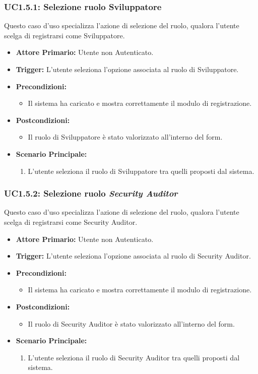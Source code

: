 \documentclass[12pt, a4paper]{article}
\begin{document}
\subsubsection{UC1.5.1: Selezione ruolo Sviluppatore}\label{uc:1.5.1}
Questo caso d'uso specializza l'azione di selezione del ruolo, qualora l'utente scelga di registrarsi come Sviluppatore.
\begin{itemize}
    \item \textbf{Attore Primario:} Utente non Autenticato.
    \item \textbf{Trigger:} L'utente seleziona l'opzione associata al ruolo di Sviluppatore.
    \item \textbf{Precondizioni:}\begin{itemize}\item Il sistema ha caricato e mostra correttamente il modulo di registrazione.\end{itemize}
    \item \textbf{Postcondizioni:}\begin{itemize}\item Il ruolo di Sviluppatore è stato valorizzato all'interno del form.\end{itemize}
    \item \textbf{Scenario Principale:}
    \begin{enumerate}
        \item L'utente seleziona il ruolo di Sviluppatore tra quelli proposti dal sistema.
    \end{enumerate}
\end{itemize}

\subsubsection{UC1.5.2: Selezione ruolo \textit{Security Auditor}}\label{uc:1.5.2}
Questo caso d'uso specializza l'azione di selezione del ruolo, qualora l'utente scelga di registrarsi come Security Auditor.
\begin{itemize}
    \item \textbf{Attore Primario:} Utente non Autenticato.
    \item \textbf{Trigger:} L'utente seleziona l'opzione associata al ruolo di Security Auditor.
    \item \textbf{Precondizioni:}\begin{itemize}\item Il sistema ha caricato e mostra correttamente il modulo di registrazione.\end{itemize}
    \item \textbf{Postcondizioni:}\begin{itemize}\item Il ruolo di Security Auditor è stato valorizzato all'interno del form.\end{itemize}
    \item \textbf{Scenario Principale:}
    \begin{enumerate}
        \item L'utente seleziona il ruolo di Security Auditor tra quelli proposti dal sistema.
    \end{enumerate}
\end{itemize}
\end{document}

